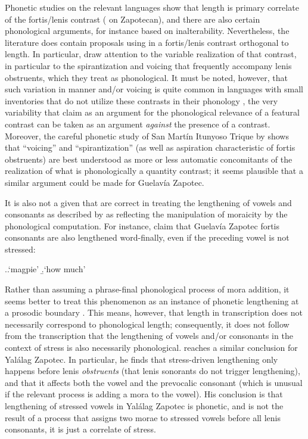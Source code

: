 Phonetic studies on the relevant languages show that length is primary correlate of the fortis\fshyp lenis contrast (\citealp[see][]{jaeger83,avelino01:_yalál_zapot,leander08:_acous_san_frans_ozolot_zapot} on Zapotecan), and there are also certain phonological arguments, for instance based on inalterability. Nevertheless, the literature does contain proposals using in a fortis\fshyp lenis contrast orthogonal to length. In particular, \citet{nellis80:_fortis_cajon_zapot} draw attention to the variable realization of that contrast, in particular to the spirantization and voicing that frequently accompany lenis obstruents, which they treat as phonological. It must be noted, however, that such variation in manner and\fshyp or voicing is quite common in languages with small inventories that do not utilize these contrasts in their phonology \citep{lorentz07:_privat}, \ie the very variability that \citet{nellis80:_fortis_cajon_zapot} claim as an argument for the phonological relevance of a featural contrast can be taken as an argument \emph{against} the presence of a contrast. Moreover, the careful phonetic study of San Martín Itunyoso Trique by \citet{dicanio10:_ituny_trique} shows that \enquote{voicing} and \enquote{spirantization} (as well as aspiration characteristic of fortis obstruents) are best understood as more or less automatic concomitants of the realization of what is phonologically a quantity contrast; it seems plausible that a similar argument could be made for Guelavía Zapotec.

It is also not a given that \citet{bye08} are correct in treating the lengthening of vowels and consonants as described by \citet{jones77:_guelav_zapot} as reflecting the manipulation of moraicity by the phonological computation. For instance, \citet{jones77:_guelav_zapot} claim that Guelavía Zapotec fortis consonants are also lengthened word\hyp finally, even if the preceding vowel is not stressed:

\ex.\a.\mbi{[ˈkuʂːaʂː]}`magpie'
\b.\mbi{[ˈβelːakʰː]}`how much'

Rather than assuming a phrase\hyp final phonological process of mora addition, it seems better to treat this phenomenon as an instance of phonetic lengthening at a prosodic boundary \citep[à~la][]{wightman92:_segmen,fougeron,cho05:_prosod}. This means, however, that length in transcription does not necessarily correspond to phonological length; consequently, it does not follow from the transcription that the lengthening of vowels and\fshyp or consonants in the context of stress is also necessarily phonological. \citet{avelino01:_yalál_zapot} reaches a similar conclusion for Yalálag Zapotec. In particular, he finds that stress\hyp driven lengthening only happens before lenis \emph{obstruents} (\ie that lenis sonorants do not trigger lengthening), and that it affects both the vowel and the prevocalic consonant (which is unusual if the relevant process is adding a mora to the vowel). His conclusion is that lengthening of stressed vowels in Yalálag Zapotec is phonetic, and is not the result of a process that assigns two morae to stressed vowels before all lenis consonants, \ie it is just a correlate of stress.

